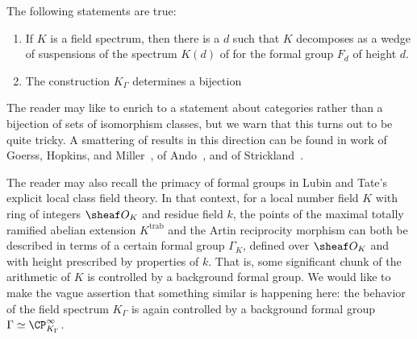 \begin{theorem}\label{AnalysisOfFieldSpectra}
The following statements are true:
\begin{enumerate}
\item If $K$ is a field spectrum, then there is a $d$ such that $K$ decomposes as a wedge of suspensions of the spectrum $K(d)$ of  for the formal group $F_d$ of height $d$.
\item The construction $K_\Gamma$ determines a bijection
\begin{center}
\end{center}
\end{enumerate}
\end{theorem}

\begin{remark}
The reader may like to enrich  to a statement about categories rather than a bijection of sets of isomorphism classes, but we warn that this turns out to be quite tricky.  A smattering of results in this direction can be found in work of Goerss, Hopkins, and Miller~\cite[Corollary 7.6]{GoerssHopkins}, of Ando~\cite[Theorems 1 and 5]{Ando}, and of Strickland~\cite{StricklandEthyOfBSigma}.
\end{remark}

\begin{remark}
The reader may also recall the primacy of formal groups in Lubin and Tate's explicit local class field theory.  In that context, for a local number field $K$ with ring of integers $\sheaf O_K$ and residue field $k$, the points of the maximal totally ramified abelian extension $K^{\text{trab}}$ and the Artin reciprocity morphism can both be described in terms of a certain formal group $\Gamma_K$, defined over $\sheaf O_K$ and with height prescribed by properties of $k$.  That is, some significant chunk of the arithmetic of $K$ is controlled by a background formal group.  We would like to make the vague assertion that something similar is happening here: the behavior of the field spectrum $K_\Gamma$ is again controlled by a background formal group $\Gamma \simeq \CP^\infty_{K_\Gamma}$.
\end{remark}

